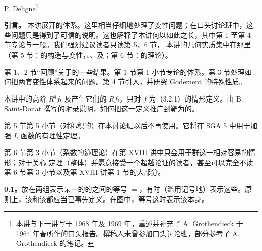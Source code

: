 \begin{center}P. Deligne\footnote{本讲与下一讲写于 1968 年及 1969 年，重述并补充了 A. Grothendieck 于 1964 年春所作的口头报告。撰稿人未曾参加口头讨论班，部分参考了 A. Grothendieck 的笔记。}\end{center}
\textbf{引言。}
本讲展开的体系。这里相当仔细地处理了变性问题；在口头讨论班中，这些问题只是得到了可信的说明。这也解释了本讲何以如此之长，其中第 1 至第 4 节专论与一般。我们强烈建议读者只读第 5、6 节，
本讲的几何实质集中在那里（第 5 节：的构造与变性，、、及；第 6 节：的理论）。

第 1、2 节“回顾”关于的一些结果。第 1 节第 1 小节专论的体系。第 3 节处理如何把两套变性体系起来的问题。第 4 节引入，并研究 Godement 的特殊性质。

本讲中的高阶 $R^qf_!$ 及产生它们的 $Rf_!$，只对 $f$ 为（3.2.1）的情形定义。由 B. Saint-Donat 撰写的附录说明，如何把这一定义推广到靶为的。

第 5 节第 5 小节（对称积的）在本讨论班以后不再使用。它将在 SGA 5 中用于加强 $L$ 函数的有理性定理。

第 6 节第 3 小节（系数的迹理论）在第 XVIII 讲中只会用于群这一相对容易的情形；对于关心 定理（整体）并愿意接受一个超越论证的读者，甚至可以完全不读第 6 节第 3 小节以及第 XVIII 讲第 1 节的大部分。

\textbf{0.1。}放在两组表示某一的的之间的等号 $=$，有时（滥用记号地）表示这些。原则上，该和该都应当已事先定义。在图中，等号这时表示该本身。

